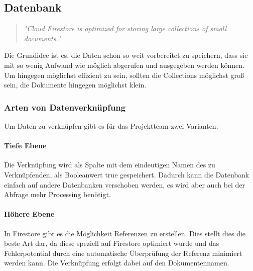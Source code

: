 \subsection{Datenbank}

\begin{quote}
  \textit{
    "Cloud Firestore is optimized for storing large collections of small documents."}
\end{quote}

Die Grundidee ist es, die Daten schon so weit vorbereitet zu speichern, dass sie mit so wenig Aufwand wie möglich abgerufen und ausgegeben werden können. Um hingegen möglichst effizient zu sein, sollten die Collections möglichst groß sein, die Dokumente hingegen möglichst klein.

\subsubsection{Arten von Datenverknüpfung}

Um Daten zu verknüpfen gibt es für das Projektteam zwei Varianten:

\paragraph{Tiefe Ebene}
Die Verknüpfung wird als Spalte mit dem eindeutigen Namen des zu Verknüpfenden, als Booleanwert true gespeichert.  Dadurch kann die Datenbank einfach auf andere Datenbanken verschoben werden, es wird aber auch bei der Abfrage mehr Processing benötigt.

\paragraph{Höhere Ebene}
In Firestore gibt es die Möglichkeit Referenzen zu erstellen. Dies stellt dies die beste Art dar, da diese speziell auf Firestore optimiert wurde und das Fehlerpotential durch eine automatische Überprüfung der Referenz minimiert werden kann. Die Verknüpfung erfolgt dabei auf den Dokumentennamen.
